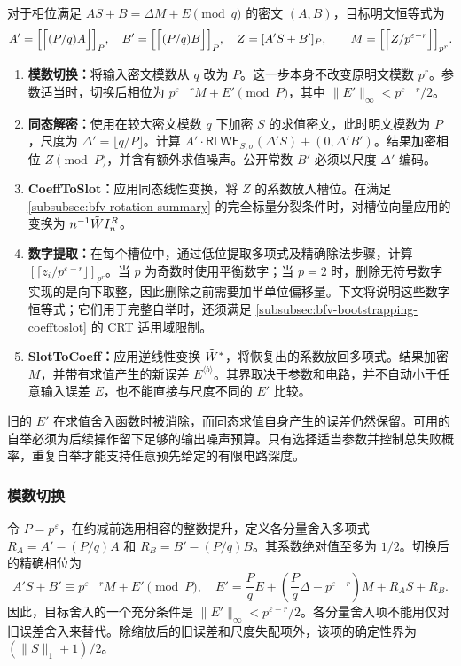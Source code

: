 对于相位满足 $AS+B=\Delta M+E\pmod q$ 的密文 $(A,B)$，目标明文恒等式为
\[
A'=\Bigl[\Bigl\lceil(P/q)A\Bigr\rfloor\Bigr]_P,\quad
B'=\Bigl[\Bigl\lceil(P/q)B\Bigr\rfloor\Bigr]_P,\quad
Z=[A'S+B']_P,
\qquad M=\Bigl[\Bigl\lceil Z/p^{\varepsilon-r}\Bigr\rfloor\Bigr]_{p^r}.
\]
\begin{enumerate}
\item \textbf{模数切换：}将输入密文模数从 $q$ 改为 $P$。这一步本身不改变原明文模数 $p^r$。参数适当时，切换后相位为 $p^{\varepsilon-r}M+E'\pmod P$，其中 $\|E'\|_\infty<p^{\varepsilon-r}/2$。
\item \textbf{同态解密：}使用在较大密文模数 $q$ 下加密 $S$ 的求值密文，此时明文模数为 $P$，尺度为 $\Delta'=\lfloor q/P\rfloor$。计算 $A'\cdot\textsf{RLWE}_{S,\sigma}(\Delta'S)+(0,\Delta'B')$。结果加密相位 $Z\pmod P$，并含有额外求值噪声。公开常数 $B'$ 必须以尺度 $\Delta'$ 编码。
\item \textbf{\textsf{CoeffToSlot}：}应用同态线性变换，将 $Z$ 的系数放入槽位。在满足 \autoref{subsubsec:bfv-rotation-summary} 的完全标量分裂条件时，对槽位向量应用的变换为 $n^{-1}\tilde W I_n^R$。
\item \textbf{数字提取：}在每个槽位中，通过低位提取多项式及精确除法步骤，计算 $[\lceil z_i/p^{\varepsilon-r}\rfloor]_{p^r}$。当 $p$ 为奇数时使用平衡数字；当 $p=2$ 时，删除无符号数字实现的是向下取整，因此删除之前需要加半单位偏移量。下文将说明这些数字恒等式；它们用于完整自举时，还须满足 \autoref{subsubsec:bfv-bootstrapping-coefftoslot} 的 CRT 适用域限制。
\item \textbf{\textsf{SlotToCoeff}：}应用逆线性变换 $\tilde W^*$，将恢复出的系数放回多项式。结果加密 $M$，并带有求值产生的新误差 $E^{\langle b\rangle}$。其界取决于参数和电路，并不自动小于任意输入误差 $E$，也不能直接与尺度不同的 $E'$ 比较。
\end{enumerate}

旧的 $E'$ 在求值舍入函数时被消除，而同态求值自身产生的误差仍然保留。可用的自举必须为后续操作留下足够的输出噪声预算。只有选择适当参数并控制总失败概率，重复自举才能支持任意预先给定的有限电路深度。

\subsubsection{模数切换}
\label{subsubsec:bfv-bootstrapping-modulus-switch}

令 $P=p^\varepsilon$，在约减前选用相容的整数提升，定义各分量舍入多项式 $R_A=A'-(P/q)A$ 和 $R_B=B'-(P/q)B$。其系数绝对值至多为 $1/2$。切换后的精确相位为
\[
A'S+B'\equiv p^{\varepsilon-r}M+E'\pmod P,
\quad E'=\frac PqE+\left(\frac Pq\Delta-p^{\varepsilon-r}\right)M+R_AS+R_B.
\]
因此，目标舍入的一个充分条件是 $\|E'\|_\infty<p^{\varepsilon-r}/2$。各分量舍入项不能用仅对旧误差舍入来替代。除缩放后的旧误差和尺度失配项外，该项的确定性界为 $(\|S\|_1+1)/2$。

